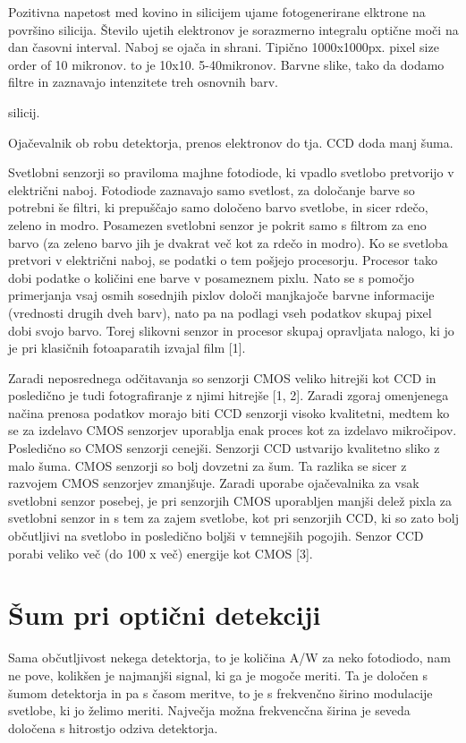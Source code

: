 Pozitivna napetost med kovino in silicijem ujame fotogenerirane elktrone na površino
silicija. Število ujetih elektronov je sorazmerno integralu optične moči na dan 
časovni interval. Naboj se ojača in shrani. Tipično 1000x1000px. pixel size order
of 10 mikronov. to je 10x10. 5-40mikronov.
Barvne slike, tako da dodamo filtre in zaznavajo intenzitete treh osnovnih barv.


silicij. 

Ojačevalnik ob robu detektorja, prenos elektronov do tja. CCD doda manj šuma. 



 

 
Svetlobni senzorji so praviloma majhne fotodiode, ki vpadlo svetlobo pretvorijo v električni naboj. Fotodiode zaznavajo samo svetlost, za določanje barve so potrebni še filtri, ki prepuščajo samo določeno barvo svetlobe, in sicer rdečo, zeleno in modro. Posamezen svetlobni senzor je pokrit samo s filtrom za eno barvo (za zeleno barvo jih je dvakrat več kot za rdečo in modro).  Ko se svetloba pretvori v električni naboj, se podatki o tem pošjejo procesorju. Procesor tako dobi podatke o količini ene barve v posameznem pixlu. Nato se s pomočjo primerjanja vsaj osmih sosednjih pixlov določi manjkajoče barvne informacije (vrednosti drugih dveh barv), nato pa na podlagi vseh podatkov skupaj pixel dobi svojo barvo. Torej slikovni senzor in procesor skupaj opravljata nalogo, ki jo je pri klasičnih fotoaparatih izvajal film [1].
 
 Zaradi neposrednega odčitavanja so senzorji CMOS veliko hitrejši kot CCD in posledično je tudi fotografiranje z njimi hitrejše [1, 2].     Zaradi zgoraj omenjenega načina prenosa podatkov morajo biti CCD senzorji visoko kvalitetni, medtem ko se za izdelavo CMOS senzorjev uporablja enak proces kot za izdelavo mikročipov. Posledično so CMOS senzorji cenejši.
    Senzorji CCD ustvarijo kvalitetno sliko z malo šuma. CMOS senzorji so bolj dovzetni za šum. Ta razlika se sicer z razvojem CMOS senzorjev zmanjšuje.
    Zaradi uporabe ojačevalnika za vsak svetlobni senzor posebej, je pri senzorjih CMOS uporabljen manjši delež pixla za svetlobni senzor in s tem za zajem svetlobe, kot pri senzorjih CCD, ki so zato bolj občutljivi na svetlobo in posledično boljši v temnejših pogojih.
    Senzor CCD porabi veliko več (do 100 x več) energije kot CMOS [3].
 
 
 
\section{Šum pri optični detekciji}
Sama občutljivost nekega detektorja, to je količina A/W za neko fotodiodo, nam ne pove, kolikšen 
je najmanjši signal, ki ga je mogoče meriti. Ta je določen s šumom detektorja in pa s časom 
meritve, to je s frekvenčno širino modulacije svetlobe, ki jo želimo meriti. Največja 
možna frekvencčna širina je seveda določena s hitrostjo odziva detektorja.

